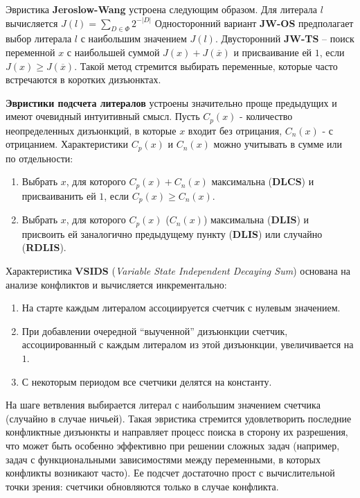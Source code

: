 Эвристика \textbf{Jeroslow-Wang} устроена следующим образом. Для литерала $l$ вычисляется $J(l) = \sum_{D \in \Phi} 2^{-\left|D\right|}$
Односторонний вариант \textbf{JW-OS} предполагает выбор литерала $l$ с наибольшим значением $J(l)$. Двусторонний \textbf{JW-TS} – поиск переменной $x$ с наибольшей суммой $J(x)+J(\overline{x})$ и присваивание ей $1$, если $J(x) \ge J(\overline{x})$. Такой метод стремится выбирать переменные, которые часто встречаются в коротких дизъюнктах.

\textbf{Эвристики подсчета литералов} устроены значительно проще предыдущих и имеют очевидный интуитивный смысл. Пусть $C_p(x)$ - количество неопределенных дизъюнкций, в которые $x$ входит без отрицания, $C_n(x)$ - с отрицанием. 
Характеристики $C_p(x)$ и $C_n(x)$ можно учитывать в сумме или по отдельности:

\begin{enumerate}[leftmargin=1cm,topsep=0pt,itemsep=-1ex,partopsep=1ex,parsep=1ex,label=\arabic{*}.]
\item Выбрать $x$, для которого $C_p(x) + C_n(x)$ максимальна (\textbf{DLCS}) и присваиванить ей $1$, если $C_p(x) \ge C_n(x)$.
\item Выбрать $x$, для которого $C_p(x)$ ($C_n(x)$) максимальна (\textbf{DLIS}) и присвоить ей заналогично предыдущему пункту (\textbf{DLIS}) или случайно (\textbf{RDLIS}).
\end{enumerate}

Характеристика \textbf{VSIDS} (\textit{Variable State Independent Decaying Sum}) основана на анализе конфликтов и вычисляется инкрементально:

\begin{enumerate}[leftmargin=1cm,topsep=0pt,itemsep=-1ex,partopsep=1ex,parsep=1ex,label=\arabic{*}.]
\item На старте каждым литералом ассоциируется счетчик с нулевым значением.
\item При добавлении очередной \enquote{выученной} дизъюнкции счетчик, ассоциированный с каждым литералом из этой дизъюнкции, увеличивается на $1$.
\item С некоторым периодом все счетчики делятся на константу.
\end{enumerate}

На шаге ветвления выбирается литерал с наибольшим значением счетчика (случайно в случае ничьей). Такая эвристика стремится удовлетворить последние конфликтные дизъюнкты и направляет процесс поиска в сторону их разрешения, что может быть особенно эффективно при решении сложных задач (например, задач с функциональными зависимостями между переменными, в которых конфликты возникают часто). Ее подсчет достаточно прост с вычислительной точки зрения: счетчики обновляются только в случае конфликта.

